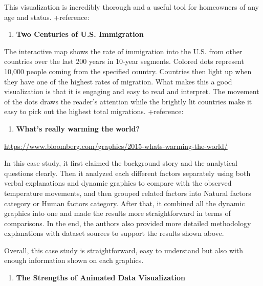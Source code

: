 \documentclass[]{book}
\providecommand{\tightlist}{%
  \setlength{\itemsep}{0pt}\setlength{\parskip}{0pt}}
\theoremstyle{definition}
\theoremstyle{definition}
\theoremstyle{definition}
\theoremstyle{remark}
\begin{document}
This visualization is incredibly thorough and a useful tool for
homeowners of any age and status. +reference: \citep{rentorbuy}

\begin{enumerate}
\def\labelenumi{\arabic{enumi}.}
\setcounter{enumi}{5}
\tightlist
\item
  \textbf{Two Centuries of U.S. Immigration}
\end{enumerate}

The interactive map shows the rate of immigration into the U.S. from
other countries over the last 200 years in 10-year segments. Colored
dots represent 10,000 people coming from the specified country.
Countries then light up when they have one of the highest rates of
migration. What makes this a good visualization is that it is engaging
and easy to read and interpret. The movement of the dots draws the
reader's attention while the brightly lit countries make it easy to pick
out the highest total migrations. +reference: \citep{Immigration}

\begin{enumerate}
\def\labelenumi{\arabic{enumi}.}
\setcounter{enumi}{6}
\tightlist
\item
  \textbf{What's really warming the world?}
\end{enumerate}

\url{https://www.bloomberg.com/graphics/2015-whats-warming-the-world/}

In this case study, it first claimed the background story and the
analytical questions clearly. Then it analyzed each different factors
separately using both verbal explanations and dynamic graphics to
compare with the observed temperature movements, and then grouped
related factors into Natural factors category or Human factors category.
After that, it combined all the dynamic graphics into one and made the
results more straightforward in terms of comparisons. In the end, the
authors also provided more detailed methodology explanations with
dataset sources to support the results shown above.

Overall, this case study is straightforward, easy to understand but also
with enough information shown on each graphics.

\begin{enumerate}
\def\labelenumi{\arabic{enumi}.}
\setcounter{enumi}{7}
\tightlist
\item
  \textbf{The Strengths of Animated Data Visualization}
\end{enumerate}
\end{document}
